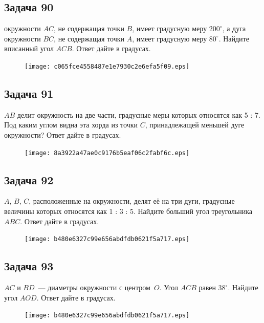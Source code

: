 \documentclass[a4paper,10pt]{article} %
\begin{document}
\begin{spacing}{1.0}
{\subsection*{Задача 90}
 окружности $AC$, не содержащая точки $B$, имеет градусную меру $200^\circ$, а дуга окружности $BC$, не содержащая точки $A$, имеет градусную меру $80^\circ$. Найдите вписанный угол $ACB$. Ответ дайте в градусах.

\vspace{1.5cm}

\begin{figure}{\texttt{[image: c065fce4558487e1e7930c2e6efa5f09.eps]}}\end{figure}
\subsection*{Задача 91}
 $AB$ делит окружность на две части, градусные меры которых относятся как 5 : 7. Под каким углом видна эта хорда из точки $C$, принадлежащей меньшей дуге окружности? Ответ дайте в градусах.

\vspace{1.5cm}

\begin{figure}{\texttt{[image: 8a3922a47ae0c9176b5eaf06c2fabf6c.eps]}}\end{figure}
\subsection*{Задача 92}
 $A$, $B$, $C$, расположенные на окружности, делят её на три дуги, градусные величины которых относятся как 1 : 3 : 5. Найдите больший угол треугольника $ABC$. Ответ дайте в градусах.

\vspace{1.5cm}

\begin{figure}{\texttt{[image: b480e6327c99e656abdfdb0621f5a717.eps]}}\end{figure}
\subsection*{Задача 93}
 $AC$ и $BD$~--- диаметры окружности с центром~$O$. Угол $ACB$ равен $38^\circ$. Найдите угол $AOD$. Ответ дайте в градусах.

\vspace{1.5cm}

\begin{figure}{\texttt{[image: b480e6327c99e656abdfdb0621f5a717.eps]}}\end{figure}
}
\end{spacing}
\end{document}
